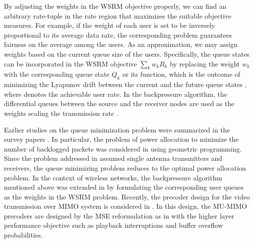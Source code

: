 By adjusting the weights in the \ac{WSRM} objective properly, we can find an arbitrary rate-tuple in the rate region that maximizes the suitable objective measures. For example, if the weight of each user is set to be inversely proportional to its average data rate, the corresponding problem guarantees fairness on the average among the users. As an approximation, we may assign weights based on the current queue size of the users. Specifically, the queue states can be incorporated in the \ac{WSRM} objective $\sum_k w_k R_k$ by replacing the weight $w_k$ with the corresponding queue state $Q_k$ or its function, which is the outcome of minimizing the Lyapunov drift between the current and the future queue states \cite{tassiulas,neely2010stochastic}, where  denotes the achievable user rate. In the backpressure algorithm, the differential queues between the source and the receiver nodes are used as the weights scaling the transmission rate \cite{georgiadis2006resource}.

Earlier studies on the queue minimization problem were summarized in the survey papers \cite{berry2004cross,layering_as_opt}. In particular, the problem of power allocation to minimize the number of backlogged packets was considered in \cite{qps_cioffi} using geometric programming. Since the problem addressed in \cite{qps_cioffi} assumed single antenna transmitters and receivers, the queue minimizing problem reduces to the optimal power allocation problem. In the context of wireless networks, the backpressure algorithm mentioned above was extended in \cite{weeraddana2011resource} by formulating the corresponding user queues as the weights in the \ac{WSRM} problem. Recently, the precoder design for the video transmission over \ac{MIMO} system is considered in \cite{video_queues}. In this design, the \ac{MU}-\ac{MIMO} precoders are designed by the \ac{MSE} reformulation as in \cite{christensen2008weighted} with the higher layer performance objective such as playback interruptions and buffer overflow probabilities.

